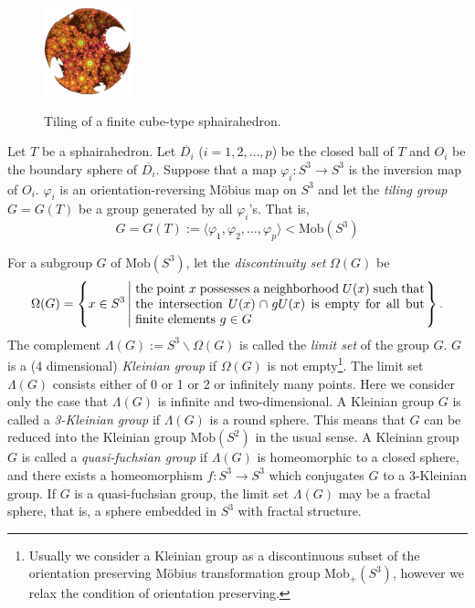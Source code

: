 \documentclass[suppldata, dvipdfmx]{interact}
\theoremstyle{plain}%
\theoremstyle{definition}
\theoremstyle{remark}
\theoremstyle{problemstyle}
\begin{document}
\begin{figure}[H]
 \hspace*{\fill}
 \begin{minipage}[t]{0.18\textwidth}
  \centering
  \includegraphics[width=1in, height=1in, keepaspectratio]{./img/constructFractal/finiteProcess/final.jpg}
  \label{fig:sphaira-final}
 \end{minipage}
 \hspace*{\fill}
 \caption{Tiling of a finite cube-type sphairahedron.}
 \label{fig:sphairahedronTile}
\end{figure}

Let $T$ be a sphairahedron.  Let $\overline{D_i}$ ($i = 1,2,\ldots, p$) be the closed ball of $T$ and $O_i$ be the boundary sphere of $\overline{D_i}$.  Suppose that a map $\varphi_i:S^3 \to S^3$ is the inversion map of $O_i$.  $\varphi_i$ is an orientation-reversing M\"obius map on $S^3$ and let the {\it tiling group} $G=G(T)$ be a group generated by all $\varphi_i$'s.  That is,
\[
 G = G(T) := \langle\varphi_1, \varphi_2, \ldots , \varphi_p  \rangle < \text{Mob}(S^3)
\]

For a subgroup $G$ of
$\text{Mob}(S^3)$, let the {\it discontinuity set} $\Omega(G)$ be
\[
\Omega(G) = \left\{ x \in S^3 \left| \hspace{1mm} 
\begin{minipage}{8cm}
the point $x$ possesses a neighborhood $U(x)$
such that the intersection $U(x) \cap gU(x)$ is empty for all but finite
elements $g\in G$
\end{minipage}
 \right. \right\}.
\]
The complement $\Lambda(G) := S^3 \backslash \Omega(G)$ is called the
{\it limit set} of the group $G$. $G$ is a (4 dimensional) {\it Kleinian group} if $\Omega(G)$ is
not empty\footnote{Usually we consider a Kleinian group as a discontinuous subset of the orientation preserving M\"obius transformation group $\text{Mob}_+(S^3)$, however we relax the condition of orientation preserving.}. The limit set $\Lambda(G)$ consists either of 0 or 1 or 2 or
infinitely many points. Here we consider only the case that $\Lambda(G)$
is infinite and two-dimensional. 
A Kleinian group $G$ is called a
{\it 3-Kleinian group} if $\Lambda(G)$ is a round sphere. This means that $G$ can be reduced into the Kleinian group $\text{Mob}(S^2)$ in the usual sense.  
A Kleinian group $G$ is called a
{\it quasi-fuchsian group} if $\Lambda(G)$ is homeomorphic to a closed sphere, 
and there exists a homeomorphism $f:S^3 \rightarrow S^3$ which conjugates
$G$ to a 3-Kleinian group. If $G$ is a quasi-fuchsian group, the limit set
$\Lambda(G)$ may be a fractal sphere, that is, a sphere embedded in $S^3$ with
 fractal structure.
\end{document}

